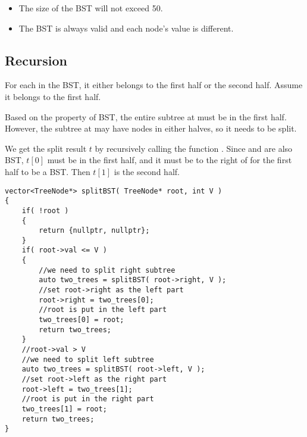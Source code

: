 \begin{itemize}
\item The size of the BST will not exceed 50.
\item The BST is always valid and each node's value is different.
\end{itemize}

\subsection{Recursion}
For each  in the BST, it either belongs to the first half or the second half. Assume it belongs to the first half.

Based on the property of BST, the entire subtree at  must be in the first half. However, the subtree at  may have nodes in either halves, so it needs to be split.

We get the split result $t$ by recursively calling the function . Since  and  are also BST, $t[0]$ must be in the first half, and it must be to the right of  for the first half to be a BST. Then $t[1]$ is the second half.

\setcounter{lstlisting}{0}
\begin{lstlisting}[style=customc, caption={Recursion}]
vector<TreeNode*> splitBST( TreeNode* root, int V )
{
    if( !root )
    {
        return {nullptr, nullptr};
    }
    if( root->val <= V )
    {
        //we need to split right subtree
        auto two_trees = splitBST( root->right, V );
        //set root->right as the left part
        root->right = two_trees[0];
        //root is put in the left part
        two_trees[0] = root;
        return two_trees;
    }
    //root->val > V
    //we need to split left subtree
    auto two_trees = splitBST( root->left, V );
    //set root->left as the right part
    root->left = two_trees[1];
    //root is put in the right part
    two_trees[1] = root;
    return two_trees;
}
\end{lstlisting}